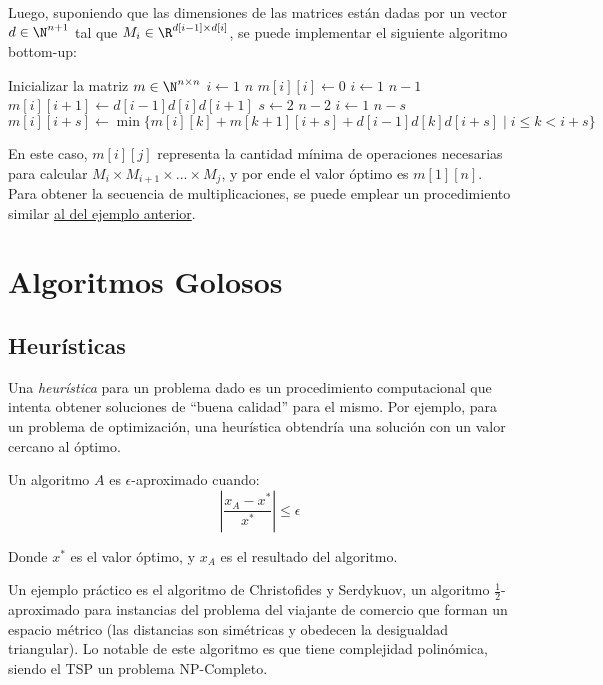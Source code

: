 Luego, suponiendo que las dimensiones de las matrices están dadas por un vector $d \in \N^{n+1}$ tal que $M_i \in \R^{d[i-1] \times d[i]}$, se puede implementar el siguiente algoritmo bottom-up:

\begin{codebox}
    \li Inicializar la matriz $m \in \N^{n \times n}$
    \li \For $i \gets 1$ \To $n$ \Do
    \li $m[i][i] \gets 0$
    \End
    \li \For $i \gets 1$ \To $n - 1$ \Do
    \li $m[i][i + 1] \gets d[i - 1]d[i]d[i + 1]$
    \End
    \li \For $s \gets 2$ \To $n - 2$ \Do
    \li \For $i \gets 1$ \To $n - s$ \Do
    \li $m[i][i + s] \gets \min{\{m[i][k] + m[k+1][i+s] + d[i-1]d[k]d[i+s] \mid i \leq k < i + s\}}$
    \End
    \End
\end{codebox}

En este caso, $m[i][j]$ representa la cantidad mínima de operaciones necesarias para calcular $M_i \times M_{i+1} \times ... \times M_j$, y por ende el valor óptimo es $m[1][n]$. Para obtener la secuencia de multiplicaciones, se puede emplear un procedimiento similar \hyperref[reconstruccion-solucion]{al del ejemplo anterior}.


\section{Algoritmos Golosos}

\subsection{Heurísticas}

Una \textit{heurística} para un problema dado es un procedimiento computacional que intenta obtener soluciones de ``buena calidad'' para el mismo. Por ejemplo, para un problema de optimización, una heurística obtendría una solución con un valor cercano al óptimo.

Un algoritmo $A$ es $\epsilon$-aproximado cuando:
$$\left|\frac{x_A - x^*}{x^*}\right| \leq \epsilon$$

Donde $x^*$ es el valor óptimo, y $x_A$ es el resultado del algoritmo.

Un ejemplo práctico es el algoritmo de Christofides y Serdykuov, un algoritmo $\frac{1}{2}$-aproximado para instancias del problema del viajante de comercio que forman un espacio métrico (las distancias son simétricas y obedecen la desigualdad triangular). Lo notable de este algoritmo es que tiene complejidad polinómica, siendo el TSP un problema NP-Completo.


